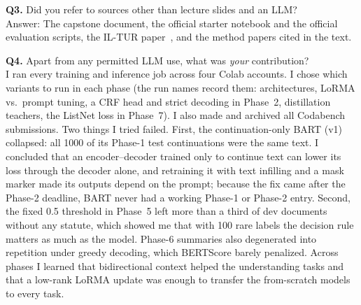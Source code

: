 \documentclass[11pt, oneside]{article}
\begin{document}
\par\medskip
\noindent
\textbf{Q3.} Did you refer to sources other than lecture slides and an LLM? \\[0.4em]
Answer: The capstone document, the official starter notebook and the official evaluation scripts, the IL-TUR paper~\cite{joshi2024iltur}, and the method papers cited in the text.
\par\medskip
\noindent
\textbf{Q4.} Apart from any permitted LLM use, what was \emph{your} contribution? \\[0.4em]
I ran every training and inference job across four Colab accounts. I chose which variants to run in each phase (the run names record them: architectures, LoRMA vs.\ prompt tuning, a CRF head and strict decoding in Phase~2, distillation teachers, the ListNet loss in Phase~7). I also made and archived all Codabench submissions. Two things I tried failed. First, the continuation-only BART (v1) collapsed: all 1000 of its Phase-1 test continuations were the same text. I concluded that an encoder--decoder trained only to continue text can lower its loss through the decoder alone, and retraining it with text infilling and a mask marker made its outputs depend on the prompt; because the fix came after the Phase-2 deadline, BART never had a working Phase-1 or Phase-2 entry. Second, the fixed 0.5 threshold in Phase~5 left more than a third of dev documents without any statute, which showed me that with 100 rare labels the decision rule matters as much as the model. Phase-6 summaries also degenerated into repetition under greedy decoding, which BERTScore barely penalized. Across phases I learned that bidirectional context helped the understanding tasks and that a low-rank LoRMA update was enough to transfer the from-scratch models to every task.



\end{document}
